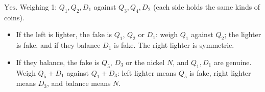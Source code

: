 $\boxed{\text{Yes}}$. Weighing 1: $Q_1,Q_2,D_1$ against $Q_3,Q_4,D_2$ (each side holds the same kinds of coins).
\begin{itemize}
\item If the left is lighter, the fake is $Q_1$, $Q_2$ or $D_1$: weigh $Q_1$ against $Q_2$; the lighter is fake, and if they balance $D_1$ is fake. The right lighter is symmetric.
\item If they balance, the fake is $Q_5$, $D_3$ or the nickel $N$, and $Q_1,D_1$ are genuine. Weigh $Q_5+D_1$ against $Q_1+D_3$: left lighter means $Q_5$ is fake, right lighter means $D_3$, and balance means $N$.
\end{itemize}
